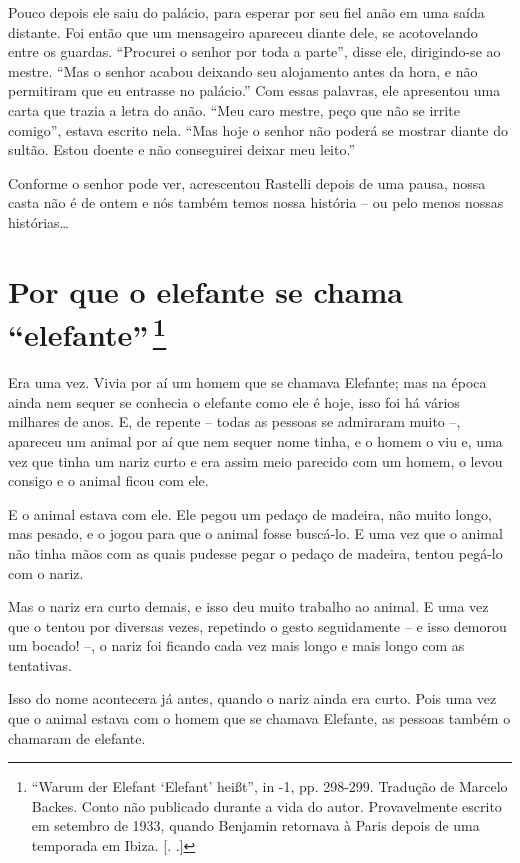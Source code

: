 Pouco depois ele saiu do palácio, para esperar por seu fiel anão em uma
saída distante. Foi então que um mensageiro apareceu diante dele, se
acotovelando entre os guardas. ``Procurei o senhor por toda a parte'',
disse ele, dirigindo-se ao mestre. ``Mas o senhor acabou deixando seu
alojamento antes da hora, e não permitiram que eu entrasse no palácio.''
Com essas palavras, ele apresentou uma carta que trazia a letra do anão.
``Meu caro mestre, peço que não se irrite comigo'', estava escrito nela.
``Mas hoje o senhor não poderá se mostrar diante do sultão. Estou doente
e não conseguirei deixar meu leito.''

Conforme o senhor pode ver, acrescentou Rastelli depois de uma pausa,
nossa casta não é de ontem e nós também temos nossa história -- ou pelo
menos nossas histórias\ldots{}

\chapter{Por que o elefante se chama ``elefante''\,\footnote[*]{``Warum der Elefant
  `Elefant' heißt'', in  -1, pp. 298-299. Tradução de Marcelo
  Backes. Conto não publicado durante a vida do autor. Provavelmente
  escrito em setembro de 1933, quando Benjamin retornava à Paris depois
  de uma temporada em Ibiza. [. .]} }

Era uma vez. Vivia por aí um homem que se chamava Elefante; mas na época
ainda nem sequer se conhecia o elefante como ele é hoje, isso foi há
vários milhares de anos. E, de repente -- todas as pessoas se admiraram
muito --, apareceu um animal por aí que nem sequer nome tinha, e o homem
o viu e, uma vez que tinha um nariz curto e era assim meio parecido com
um homem, o levou consigo e o animal ficou com ele.

E o animal estava com ele. Ele pegou um pedaço de madeira, não muito
longo, mas pesado, e o jogou para que o animal fosse buscá-lo. E uma vez
que o animal não tinha mãos com as quais pudesse pegar o pedaço de
madeira, tentou pegá-lo com o nariz.

Mas o nariz era curto demais, e isso deu muito trabalho ao animal. E uma
vez que o tentou por diversas vezes, repetindo o gesto seguidamente -- e
isso demorou um bocado! --, o nariz foi ficando cada vez mais longo e
mais longo com as tentativas.

Isso do nome acontecera já antes, quando o nariz ainda era curto. Pois
uma vez que o animal estava com o homem que se chamava Elefante, as
pessoas também o chamaram de elefante.

